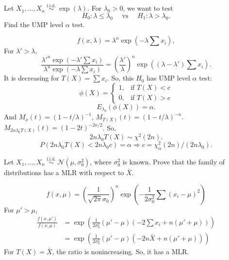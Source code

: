 \begin{ex}
    Let \(X_{1}, \ldots, X_{n} \stackrel{\text { i.i.d. }}{\sim} \exp (\lambda)\). For \(\lambda_{0}>0\), we want to test
    \[
        H_{0}: \lambda \leq \lambda_{0} \quad \text { vs } \quad H_{1}: \lambda>\lambda_{0} .
    \]
    Find the UMP level \(\alpha\) test. 
\end{ex}

\begin{solution}
    \[
        f(x, \lambda)=\lambda^n\exp\left(-\lambda\sum x_i\right), 
    \]
    For $\lambda'>\lambda$, 
    \[
        \frac{\lambda'^n\exp\left(-\lambda'\sum x_i\right)}{\lambda^n\exp\left(-\lambda\sum x_i\right)}=\left(\frac{\lambda'}{\lambda}\right)^n\exp\left((\lambda-\lambda')\sum x_i\right). 
    \]
    It is decreasing for $T(X)=\sum x_i$. So, this $H_0$ has UMP level $\alpha$ test: 
    \[
        \phi(X)=\left\{\begin{matrix}
            1, & \text{if } T(X)<c\\
            0, & \text{if } T(X)>c
        \end{matrix}\right.
    \]
    \[
        E_{\lambda_0}(\phi(X))=\alpha. 
    \]
    And $M_x(t)=(1-t/\lambda)^{-1}$, $M_{T(X)}(t)=(1-t/\lambda)^{-n}$. $M_{2n\lambda_0T(X)}(t)=(1-2t)^{-2n/2}$. So, 
    \[
        2n\lambda_0T(X)\sim \chi^2(2n). 
    \]
    \[
        P(2n\lambda_0T(X)<2n\lambda_0c)=\alpha\Rightarrow c=\chi^2_{\alpha}(2n)/(2n\lambda_0). 
    \]
\end{solution}


\begin{ex}
    Let \(X_{1}, \ldots, X_{n} \stackrel{\text { i.i.d. }}{\sim} \mathcal{N}\left(\mu, \sigma_{0}^{2}\right)\), where \(\sigma_{0}^{2}\) is known. Prove that the family of distributions has a MLR with respect to \(\bar{X}\). 
\end{ex}

\begin{solution}
    \[
        f(x, \mu)=\left(\frac{1}{\sqrt{2\pi}\sigma_0}\right)^n\exp\left(-\frac{1}{2\sigma_{0}^{2}}\sum\left(x_i-\mu\right)^2\right)
    \]
    For $\mu'>\mu$, 
    \[\begin{aligned}
        \frac{f(x,\mu')}{f(x,\mu)}&=\exp\left(\frac{1}{2\sigma_0^2}(\mu'-\mu)\left(-2\sum x_i+n(\mu'+\mu)\right)\right)\\
        &=\exp\left(\frac{1}{2\sigma_0^2}(\mu'-\mu)\left(-2n\bar{X}+n(\mu'+\mu)\right)\right)
    \end{aligned}
    \]
    For $T(X)=\bar{X}$, the ratio is nonincreasing. So, it has a MLR. 
\end{solution}

